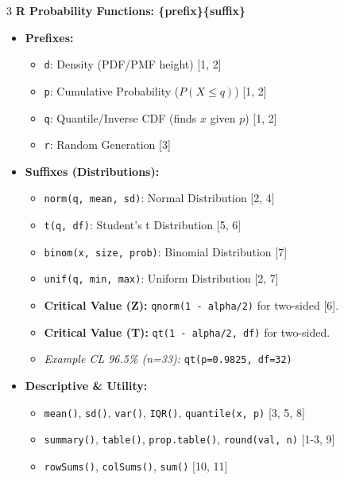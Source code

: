 \documentclass[10pt]{article}
\begin{document}
\begin{multicols}{3}
\textbf{R Probability Functions: \{prefix\}\{suffix\}}
\begin{itemize}
    \item \textbf{Prefixes:} 
    \begin{itemize}
        \item \texttt{d}: Density (PDF/PMF height) [1, 2]
        \item \texttt{p}: Cumulative Probability ($P(X \le q)$) [1, 2]
        \item \texttt{q}: Quantile/Inverse CDF (finds $x$ given $p$) [1, 2]
        \item \texttt{r}: Random Generation [3]
    \end{itemize}
    \item \textbf{Suffixes (Distributions):}
    \begin{itemize}
        \item \texttt{norm(q, mean, sd)}: Normal Distribution [2, 4]
        \item \texttt{t(q, df)}: Student's t Distribution [5, 6]
        \item \texttt{binom(x, size, prob)}: Binomial Distribution [7]
        \item \texttt{unif(q, min, max)}: Uniform Distribution [2, 7]
        \item \textbf{Critical Value (Z):} \texttt{qnorm(1 - alpha/2)} for two-sided [6].
        \item \textbf{Critical Value (T):} \texttt{qt(1 - alpha/2, df)} for two-sided.
        \item \textit{Example CL 96.5\% (n=33):} \texttt{qt(p=0.9825, df=32)}
    \end{itemize}
    \item \textbf{Descriptive \& Utility:}
    \begin{itemize}
        \item \texttt{mean()}, \texttt{sd()}, \texttt{var()}, \texttt{IQR()}, \texttt{quantile(x, p)} [3, 5, 8]
        \item \texttt{summary()}, \texttt{table()}, \texttt{prop.table()}, \texttt{round(val, n)} [1-3, 9]
        \item \texttt{rowSums()}, \texttt{colSums()}, \texttt{sum()} [10, 11]
    \end{itemize}

\end{itemize}
\end{multicols}
\end{document}
